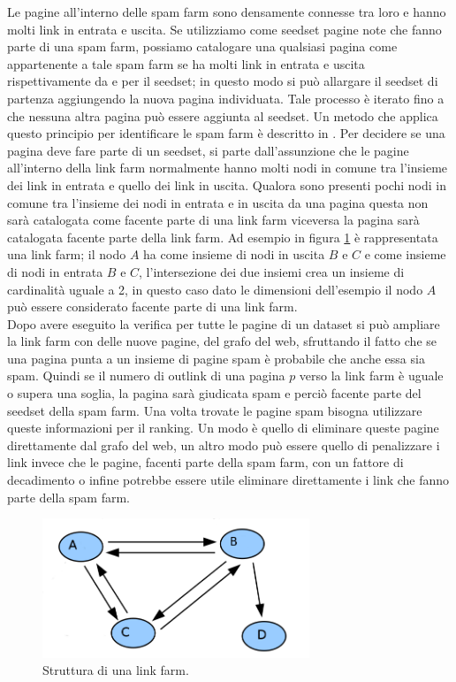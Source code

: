 Le pagine all'interno delle spam farm sono densamente connesse tra loro e hanno molti link in entrata e uscita. Se utilizziamo come seedset pagine note che fanno parte di una spam farm, possiamo catalogare una qualsiasi pagina come appartenente a tale spam farm se ha molti link in entrata e uscita rispettivamente da e per il seedset; in questo modo si può allargare il seedset di partenza aggiungendo la nuova pagina individuata. Tale processo è iterato fino a che nessuna altra pagina può essere aggiunta al seedset. Un metodo che applica questo principio per identificare le spam farm è descritto  in \cite{Wu05identifyinglink}. Per decidere se una pagina deve fare parte di un seedset, si parte dall'assunzione che le pagine all'interno della link farm normalmente hanno molti nodi in comune tra l'insieme dei link in entrata e quello dei link in uscita. Qualora  sono presenti pochi nodi in comune tra l'insieme dei nodi in entrata e in uscita da una pagina questa non sarà catalogata come facente parte di una link 
farm viceversa la pagina sarà catalogata facente parte della link farm. Ad esempio in figura \ref{fig:linkfarm} è rappresentata una link farm; il nodo \(A\) ha come insieme di nodi in uscita \(B\) e \(C\)  e come insieme di nodi in entrata \(B\) e \(C\), l'intersezione dei due insiemi crea un insieme di cardinalità uguale a 2, in questo caso dato le dimensioni dell'esempio il nodo \(A\) può essere considerato facente parte di una link farm.\\
Dopo avere eseguito la verifica per tutte le pagine di un dataset si può ampliare la link farm con delle nuove pagine, del grafo del web, sfruttando il fatto che se una pagina punta a un insieme di pagine spam è probabile che anche essa sia spam. Quindi se il numero di outlink di una pagina \(p\) verso la link farm è uguale o supera una soglia, la pagina sarà giudicata spam e perciò facente parte del seedset della spam farm. Una volta trovate le pagine spam bisogna utilizzare queste informazioni per il ranking. Un modo è quello di eliminare queste pagine direttamente dal grafo del web, un altro modo può essere quello di penalizzare i link invece che le pagine, facenti parte della spam farm, con un fattore di decadimento o infine potrebbe essere utile eliminare direttamente i link che fanno parte della spam farm.
\begin{figure}
\centering
\includegraphics[width=8cm]{immagini/linkfarm/linkfarm}
\caption{Struttura di una link farm.}
\label{fig:linkfarm}
\end{figure}

